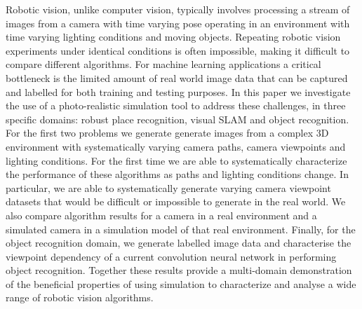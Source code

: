 
Robotic vision, unlike computer vision, typically involves processing a stream of images from a camera with time varying pose operating in an environment with
time varying lighting conditions and moving objects. Repeating robotic vision experiments under identical conditions is often impossible, making it difficult to compare different algorithms. For machine learning applications a critical bottleneck is the limited amount of real world image data that can be captured and labelled for both training and testing purposes. 
In this paper we investigate the use of a photo-realistic  simulation tool to address these challenges, in three specific domains: robust place recognition, visual SLAM and object recognition. 
For the first two problems we generate generate images from a complex 3D environment with systematically varying camera paths, camera viewpoints and lighting conditions.
For the first time we are able to systematically characterize the performance of these algorithms as paths and lighting conditions change. In particular, we are able to systematically generate varying camera viewpoint datasets that would be difficult or impossible to generate in the real world. We also compare algorithm results for a camera in a  real environment and a simulated camera in a simulation model of that real environment.
Finally, for the object recognition domain, we generate labelled image data and characterise the viewpoint dependency of a current convolution neural network in performing object recognition.
Together these results provide a multi-domain demonstration of the beneficial properties of using simulation to characterize and analyse a wide range of robotic vision algorithms.


%
